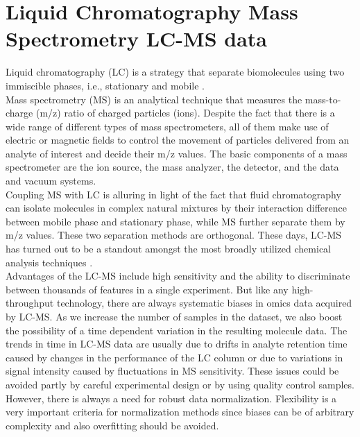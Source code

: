 \section{Liquid Chromatography Mass Spectrometry LC-MS data}
\indent Liquid chromatography (LC) is a strategy that separate biomolecules using two immiscible phases, i.e., stationary and mobile \cite{lcms}.\\
 Mass spectrometry (MS) is an analytical technique that measures the mass-to-charge (m/z) ratio of charged particles (ions)\cite{lcms}. Despite the fact that there is a wide range of different types of mass spectrometers, all of them make use of electric or magnetic fields to control the movement of particles delivered from an analyte of interest and decide their m/z values. The basic components of a mass spectrometer are the ion source, the mass analyzer, the detector, and the data and vacuum systems.\\
\indent Coupling MS with LC is alluring in light of the fact that fluid chromatography can isolate molecules in complex natural mixtures by their interaction difference between mobile phase and stationary phase, while MS further separate them by m/z values. These two separation methods are orthogonal. These days, LC-MS has turned out to be a standout amongst the most broadly utilized chemical analysis techniques \cite{lcms2}.\\
\indent Advantages of the LC-MS include high sensitivity and the ability to discriminate between thousands of features in a single experiment. But like any high-throughput technology, there are always systematic biases in omics data acquired by LC-MS. As we increase the number of samples in the dataset, we also boost the possibility of a time dependent variation in the resulting molecule data. The trends in time in LC-MS data are usually due to drifts in analyte retention time caused by changes in the performance of the LC column or due to variations in signal intensity caused by fluctuations in MS sensitivity. These issues could be avoided partly by careful experimental design or by using quality control samples. However, there is always a need for robust data normalization. Flexibility is a very important criteria for normalization methods since biases can be of arbitrary complexity and also overfitting should be avoided.


